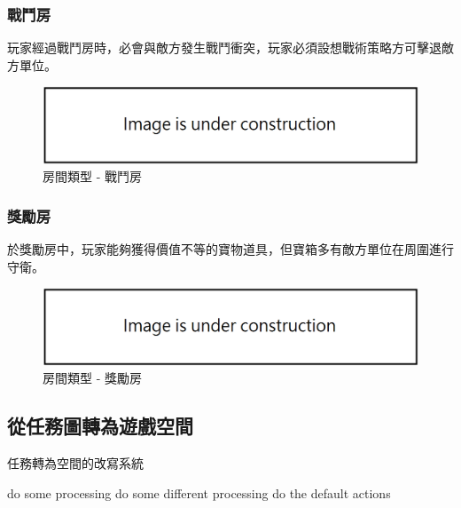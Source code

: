 \subsubsection{戰鬥房}
\label{sssec:method-spacepieces-types-battle}

玩家經過戰鬥房時，必會與敵方發生戰鬥衝突，玩家必須設想戰術策略方可擊退敵方單位。

\begin{figure}[h]
  \begin{center}
    \includegraphics[width=1.0\textwidth]{figures/under_construction.png}
    \caption{房間類型 - 戰鬥房}
    \label{fig:roomtype-battle}
  \end{center}
\end{figure}

\subsubsection{獎勵房}
\label{sssec:method-spacepieces-types-reward}

於獎勵房中，玩家能夠獲得價值不等的寶物道具，但寶箱多有敵方單位在周圍進行守衛。

\begin{figure}[h]
  \begin{center}
    \includegraphics[width=1.0\textwidth]{figures/under_construction.png}
    \caption{房間類型 - 獎勵房}
    \label{fig:roomtype-reward}
  \end{center}
\end{figure}

\subsection{從任務圖轉為遊戲空間}
\label{ssec:method-spacepieces-frommissiontospace}

\begin{algorithm}
    \caption{任務轉為空間的改寫系統}
    \label{alg:algorithm-mission-to-space-rewritesystem}
    \begin{algorithmic}
            \STATE do some processing
            \STATE do some different processing
        \ELSE
            \STATE do the default actions
        \ENDIF
    \end{algorithmic}
\end{algorithm}

